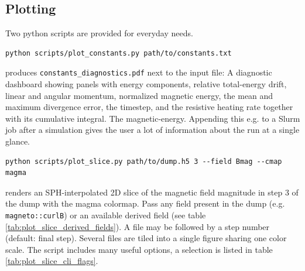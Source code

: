 \subsection{Plotting}
Two python scripts are provided for everyday needs.

\begin{verbatim}
python scripts/plot_constants.py path/to/constants.txt
\end{verbatim}

produces \texttt{constants\_diagnostics.pdf} next to the input file: A diagnostic dashboard showing panels with energy components, relative total-energy drift, linear and angular momentum, normalized magnetic energy, the mean and maximum divergence error, the timestep, and the resistive heating rate together with its cumulative integral. The magnetic-energy. Appending this e.g. to a Slurm job after a simulation gives the user a lot of information about the run at a single glance. 

\begin{verbatim}
python scripts/plot_slice.py path/to/dump.h5 3 --field Bmag --cmap magma
\end{verbatim}

renders an SPH-interpolated 2D slice of the magnetic field magnitude in step 3 of the dump with the magma colormap. Pass any field present in the dump (e.g. \texttt{magneto::curlB}) or an available derived field (see table \ref{tab:plot_slice_derived_fields}). A file may be followed by a step number (default: final step). Several files are tiled into a single figure sharing one color scale. The script includes many useful options, a selection is listed in table \ref{tab:plot_slice_cli_flags}. 

